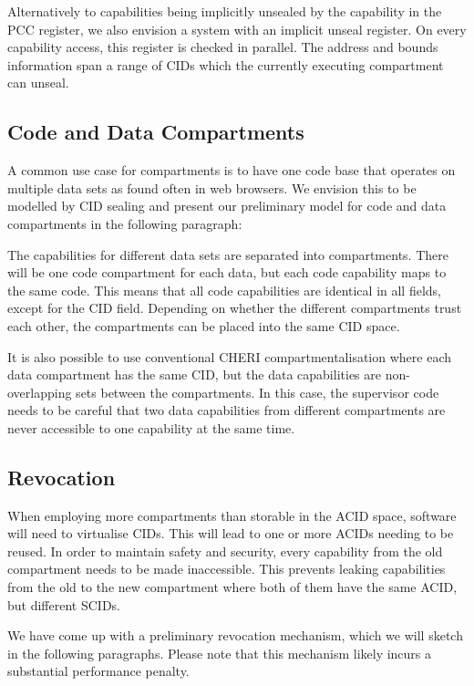 Alternatively to capabilities being implicitly unsealed by the capability in the PCC register, we also envision a system with an implicit unseal register.
On every capability access, this register is checked in parallel.
The address and bounds information span a range of CIDs which the currently executing compartment can unseal.

\subsection{Code and Data Compartments}

A common use case for compartments is to have one code base that operates on multiple data sets as found often in web browsers.
We envision this to be modelled by CID sealing and present our preliminary model for code and data compartments in the following paragraph:

The capabilities for different data sets are separated into compartments.
There will be one code compartment for each data, but each code capability maps to the same code.
This means that all code capabilities are identical in all fields, except for the CID field.
Depending on whether the different compartments trust each other, the compartments can be placed into the same CID space.

It is also possible to use conventional CHERI compartmentalisation where each data compartment has the same CID, but the data capabilities are non-overlapping sets between the compartments.
In this case, the supervisor code needs to be careful that two data capabilities from different compartments are never accessible to one capability at the same time.

\subsection{Revocation}

When employing more compartments than storable in the ACID space, software will need to virtualise CIDs.
This will lead to one or more ACIDs needing to be reused.
In order to maintain safety and security, every capability from the old compartment needs to be made inaccessible.
This prevents leaking capabilities from the old to the new compartment where both of them have the same ACID, but different SCIDs.

We have come up with a preliminary revocation mechanism, which we will sketch in the following paragraphs.
Please note that this mechanism likely incurs a substantial performance penalty.

